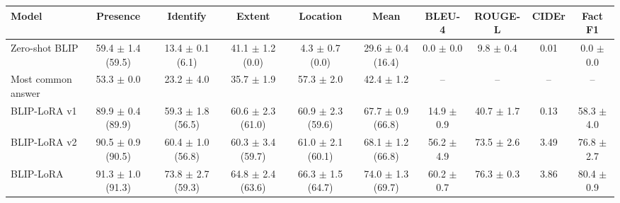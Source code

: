 \begin{tabular}{lccccccccc}
\toprule
Model & Presence & Identify & Extent & Location & Mean & BLEU-4 & ROUGE-L & CIDEr & Fact F1 \\
\midrule
Zero-shot BLIP & 59.4 $\pm$ 1.4 (59.5) & 13.4 $\pm$ 0.1 (6.1) & 41.1 $\pm$ 1.2 (0.0) & 4.3 $\pm$ 0.7 (0.0) & 29.6 $\pm$ 0.4 (16.4) & 0.0 $\pm$ 0.0 & 9.8 $\pm$ 0.4 & 0.01 & 0.0 $\pm$ 0.0 \\
Most common answer & 53.3 $\pm$ 0.0 & 23.2 $\pm$ 4.0 & 35.7 $\pm$ 1.9 & 57.3 $\pm$ 2.0 & 42.4 $\pm$ 1.2 & -- & -- & -- & -- \\
BLIP-LoRA v1 & 89.9 $\pm$ 0.4 (89.9) & 59.3 $\pm$ 1.8 (56.5) & 60.6 $\pm$ 2.3 (61.0) & 60.9 $\pm$ 2.3 (59.6) & 67.7 $\pm$ 0.9 (66.8) & 14.9 $\pm$ 0.9 & 40.7 $\pm$ 1.7 & 0.13 & 58.3 $\pm$ 4.0 \\
BLIP-LoRA v2 & 90.5 $\pm$ 0.9 (90.5) & 60.4 $\pm$ 1.0 (56.8) & 60.3 $\pm$ 3.4 (59.7) & 61.0 $\pm$ 2.1 (60.1) & 68.1 $\pm$ 1.2 (66.8) & 56.2 $\pm$ 4.9 & 73.5 $\pm$ 2.6 & 3.49 & 76.8 $\pm$ 2.7 \\
BLIP-LoRA & 91.3 $\pm$ 1.0 (91.3) & 73.8 $\pm$ 2.7 (59.3) & 64.8 $\pm$ 2.4 (63.6) & 66.3 $\pm$ 1.5 (64.7) & 74.0 $\pm$ 1.3 (69.7) & 60.2 $\pm$ 0.7 & 76.3 $\pm$ 0.3 & 3.86 & 80.4 $\pm$ 0.9 \\
\bottomrule
\end{tabular}

